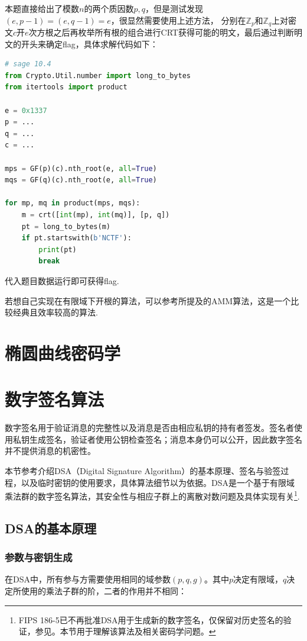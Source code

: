 \documentclass{book}
\numberwithin{equation}{subsubsection}
\begin{document}
本题直接给出了模数$n$的两个质因数$p,q$，但是测试发现$(e, p-1)=(e, q-1)=e$，很显然需要使用上述方法，
分别在$\mathbb{Z}_p$和$\mathbb{Z}_q$上对密文$c$开$e$次方根之后再枚举所有根的组合进行CRT获得可能的明文，最后通过判断明文的开头来确定flag，具体求解代码如下：
\begin{lstlisting}[language=Python,basicstyle=\ttfamily,breaklines=true,keywordstyle=\bfseries\color{blue}]
# sage 10.4
from Crypto.Util.number import long_to_bytes
from itertools import product

e = 0x1337
p = ...
q = ...
c = ...

mps = GF(p)(c).nth_root(e, all=True)
mqs = GF(q)(c).nth_root(e, all=True)

for mp, mq in product(mps, mqs):
    m = crt([int(mp), int(mq)], [p, q])
    pt = long_to_bytes(m)
    if pt.startswith(b'NCTF'):
        print(pt)
        break
\end{lstlisting}
代入题目数据运行即可获得flag.\par
若想自己实现在有限域下开根的算法，可以参考\cite{12}所提及的AMM算法，这是一个比较经典且效率较高的算法.

\newpage
\section{椭圆曲线密码学}

\newpage
\section{数字签名算法}
\label{sec:dsa}
数字签名用于验证消息的完整性以及消息是否由相应私钥的持有者签发。签名者使用私钥生成签名，验证者使用公钥检查签名；消息本身仍可以公开，因此数字签名并不提供消息的机密性。\par
本节参考\cite{29,30}介绍DSA（Digital Signature Algorithm）的基本原理、签名与验签过程，以及临时密钥的使用要求，具体算法细节以\cite{31}为依据。DSA是一个基于有限域乘法群的数字签名算法，其安全性与相应子群上的离散对数问题及具体实现有关\footnote{FIPS 186-5已不再批准DSA用于生成新的数字签名，仅保留对历史签名的验证，参见\cite{33}。本节用于理解该算法及相关密码学问题。}.\par

\subsection{DSA的基本原理}
\subsubsection{参数与密钥生成}
在DSA中，所有参与方需要使用相同的域参数$(p,q,g)$。其中$p$决定有限域，$q$决定所使用的乘法子群的阶，二者的作用并不相同：\par
\end{document}
